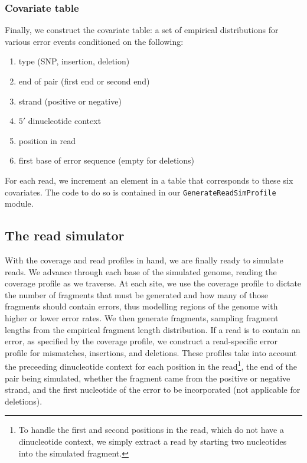 \subsubsection{Covariate table}

Finally, we construct the covariate table: a set of empirical distributions for various error events conditioned on the following:

\begin{enumerate}
    \item type (SNP, insertion, deletion)
    \item end of pair (first end or second end)
    \item strand (positive or negative)
    \item $5'$ dinucleotide context
    \item position in read
    \item first base of error sequence (empty for deletions)
\end{enumerate}

For each read, we increment an element in a table that corresponds to these six covariates.  The code to do so is contained in our \texttt{GenerateReadSimProfile} module.

\subsection{The read simulator}

With the coverage and read profiles in hand, we are finally ready to simulate reads.  We advance through each base of the simulated genome, reading the coverage profile as we traverse.  At each site, we use the coverage profile to dictate the number of fragments that must be generated and how many of those fragments should contain errors, thus modelling regions of the genome with higher or lower error rates.  We then generate fragments, sampling fragment lengths from the empirical fragment length distribution.  If a read is to contain an error, as specified by the coverage profile, we construct a read-specific error profile for mismatches, insertions, and deletions.  These profiles take into account the preceeding dinucleotide context for each position in the read\footnote{To handle the first and second positions in the read, which do not have a dinucleotide context, we simply extract a read by starting two nucleotides into the simulated fragment.}, the end of the pair being simulated, whether the fragment came from the positive or negative strand, and the first nucleotide of the error to be incorporated (not applicable for deletions).  

